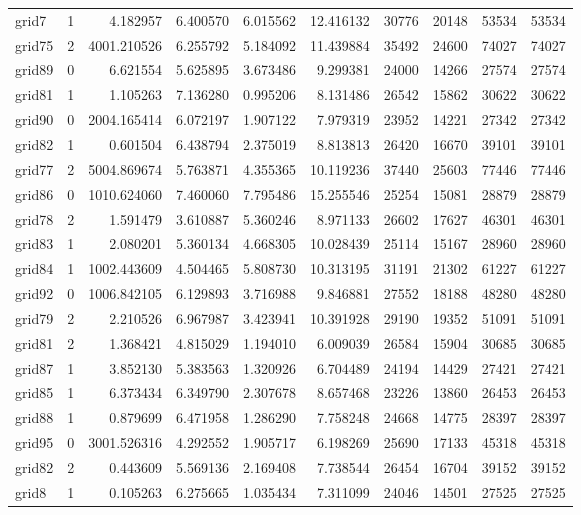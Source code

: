 \begin{longtable}{|l|r|r|r|r|r|r|r|r|r|}
grid7 & 1 & 4.182957 & 6.400570 & 6.015562 & 12.416132 & 30776 & 20148 & 53534 & 53534 \\
grid75 & 2 & 4001.210526 & 6.255792 & 5.184092 & 11.439884 & 35492 & 24600 & 74027 & 74027 \\
grid89 & 0 & 6.621554 & 5.625895 & 3.673486 & 9.299381 & 24000 & 14266 & 27574 & 27574 \\
grid81 & 1 & 1.105263 & 7.136280 & 0.995206 & 8.131486 & 26542 & 15862 & 30622 & 30622 \\
grid90 & 0 & 2004.165414 & 6.072197 & 1.907122 & 7.979319 & 23952 & 14221 & 27342 & 27342 \\
grid82 & 1 & 0.601504 & 6.438794 & 2.375019 & 8.813813 & 26420 & 16670 & 39101 & 39101 \\
grid77 & 2 & 5004.869674 & 5.763871 & 4.355365 & 10.119236 & 37440 & 25603 & 77446 & 77446 \\
grid86 & 0 & 1010.624060 & 7.460060 & 7.795486 & 15.255546 & 25254 & 15081 & 28879 & 28879 \\
grid78 & 2 & 1.591479 & 3.610887 & 5.360246 & 8.971133 & 26602 & 17627 & 46301 & 46301 \\
grid83 & 1 & 2.080201 & 5.360134 & 4.668305 & 10.028439 & 25114 & 15167 & 28960 & 28960 \\
grid84 & 1 & 1002.443609 & 4.504465 & 5.808730 & 10.313195 & 31191 & 21302 & 61227 & 61227 \\
grid92 & 0 & 1006.842105 & 6.129893 & 3.716988 & 9.846881 & 27552 & 18188 & 48280 & 48280 \\
grid79 & 2 & 2.210526 & 6.967987 & 3.423941 & 10.391928 & 29190 & 19352 & 51091 & 51091 \\
grid81 & 2 & 1.368421 & 4.815029 & 1.194010 & 6.009039 & 26584 & 15904 & 30685 & 30685 \\
grid87 & 1 & 3.852130 & 5.383563 & 1.320926 & 6.704489 & 24194 & 14429 & 27421 & 27421 \\
grid85 & 1 & 6.373434 & 6.349790 & 2.307678 & 8.657468 & 23226 & 13860 & 26453 & 26453 \\
grid88 & 1 & 0.879699 & 6.471958 & 1.286290 & 7.758248 & 24668 & 14775 & 28397 & 28397 \\
grid95 & 0 & 3001.526316 & 4.292552 & 1.905717 & 6.198269 & 25690 & 17133 & 45318 & 45318 \\
grid82 & 2 & 0.443609 & 5.569136 & 2.169408 & 7.738544 & 26454 & 16704 & 39152 & 39152 \\
grid8 & 1 & 0.105263 & 6.275665 & 1.035434 & 7.311099 & 24046 & 14501 & 27525 & 27525 \\

\end{longtable}
